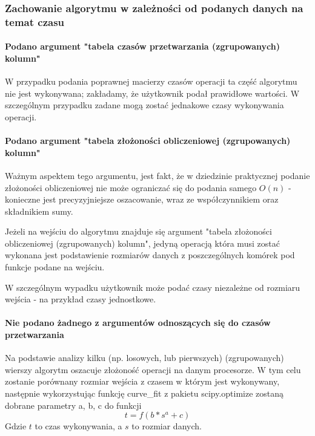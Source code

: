 \documentclass[brudnopis]{xmgr}
\begin{document}
\subsubsection{Zachowanie algorytmu w zależności od podanych danych na temat czasu}

\paragraph{Podano argument "tabela czasów przetwarzania (zgrupowanych) kolumn"}

W przypadku podania poprawnej macierzy czasów operacji ta część algorytmu nie jest wykonywana; zakładamy, że użytkownik podał prawidłowe wartości. W szczególnym przypadku zadane mogą zostać jednakowe czasy wykonywania operacji.

\paragraph{Podano argument "tabela złożoności obliczeniowej (zgrupowanych) kolumn"}

Ważnym aspektem tego argumentu, jest fakt, że w dziedzinie praktycznej podanie złożoności obliczeniowej nie może ograniczać się do podania samego $O(n)$ - konieczne jest precyzyjniejsze oszacowanie, wraz ze współczynnikiem oraz składnikiem sumy.

Jeżeli na wejściu do algorytmu znajduje się argument "tabela złożoności obliczeniowej (zgrupowanych) kolumn", jedyną operacją która musi zostać wykonana jest podstawienie rozmiarów danych z poszczególnych komórek pod funkcje podane na wejściu.

W szczególnym wypadku użytkownik może podać czasy niezależne od rozmiaru wejścia - na przykład czasy jednostkowe.

\paragraph{Nie podano żadnego z argumentów odnoszących się do czasów przetwarzania}

Na podstawie analizy kilku (np. losowych, lub pierwszych) (zgrupowanych) wierszy algorytm oszacuje złożoność operacji na danym procesorze.
W tym celu zostanie porównany rozmiar wejścia z czasem w którym jest wykonywany, następnie wykorzystując funkcję curve\_fit z pakietu scipy.optimize zostaną dobrane parametry a, b, c do funkcji
$$t = f(b * s^a + c)$$
Gdzie $t$ to czas wykonywania, a $s$ to rozmiar danych.
\end{document}
